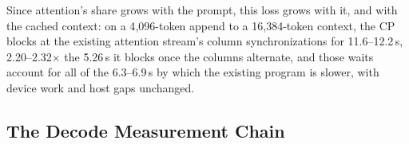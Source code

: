 Since attention's share grows with the prompt, this loss grows with it, and with the cached context: on a 4{,}096-token append to a 16{,}384-token context, the CP blocks at the existing attention stream's column synchronizations for 11.6--12.2\,s, 2.20--2.32$\times$ the 5.26\,s it blocks once the columns alternate, and those waits account for all of the 6.3--6.9\,s by which the existing program is slower, with device work and host gaps unchanged.

\subsection{The Decode Measurement Chain}
\label{app:decode-chain}

